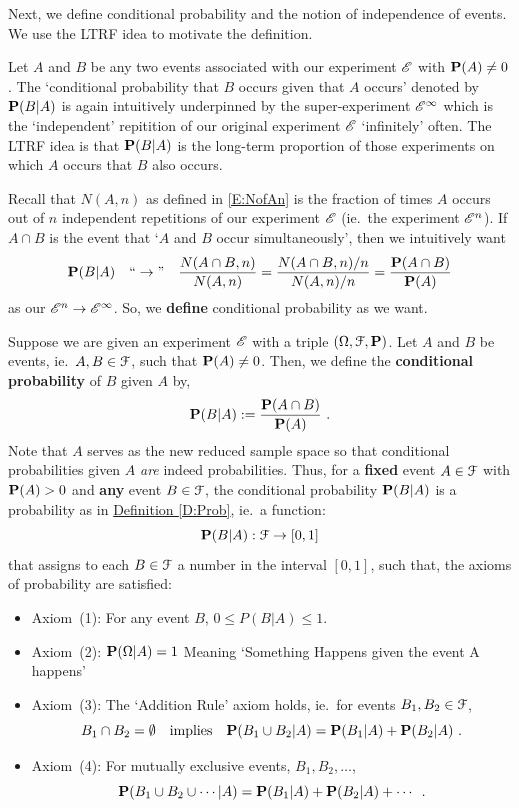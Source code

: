 Next, we define conditional probability and the notion of independence of events.  We use the LTRF idea to motivate the definition.
\begin{idea}
Let $A$ and $B$ be any two events associated with our experiment $\mathscr{E}$ with $\mathbf{P}(A) \neq 0$.  The `conditional probability that $B$ occurs given that $A$ occurs' denoted by $\mathbf{P}(B|A)$ is again intuitively underpinned by the super-experiment $\mathscr{E}^{\infty}$ which is the `independent' repitition of our original experiment $\mathscr{E}$ `infinitely' often.  The LTRF idea is that $\mathbf{P}(B|A)$ is the long-term proportion of those experiments on which $A$ occurs that $B$ also occurs.
 
Recall that $N(A,n)$ as defined in \eqref{E:NofAn} is the fraction of times $A$ occurs out of $n$ independent repetitions of our experiment $\mathscr{E}$ (ie.~the experiment $\mathscr{E}^{n}$).  If $A \cap B$ is the event that `$A$ and $B$ occur simultaneously', then we intuitively want
\[
\p(B|A) \quad \lq\lq \rightarrow " \quad \frac{N(A \cap B,n)}{N(A,n)} = \frac{N(A \cap B,n)/n}{N(A,n)/n} =  \frac{\p(A \cap B)}{\p(A)}
\]
as our $\mathscr{E}^{n} \rightarrow \mathscr{E}^{\infty}$.  So, we {\bf define} conditional probability as we want.
 \end{idea}
 \begin{definition}\label{D:CondProb}
Suppose we are given an experiment $\mathscr{E}$ with a triple $(\Omega, \mathcal{F}, \mathbf{P})$.  Let $A$ and $B$ be events, ie.~$A,B \in \mathcal{F}$, such that $\mathbf{P}(A) \neq 0$.  Then, we define the {\bf conditional probability} of $B$ given $A$ by,
 \begin{equation}\label{E:CPD}
 \mathbf{P}(B|A) := \frac{\mathbf{P}(A \cap B)}{\mathbf{P}(A)} \ .
 \end{equation}
Note that $A$ serves as the new reduced sample space so that conditional probabilities given $A$ \emph{are} indeed  probabilities.
Thus, for a {\bf fixed} event $A \in \mathcal{F}$ with $\mathbf{P}(A)>0$ and {\bf any} event $B \in \mathcal{F}$, the conditional  probability $\mathbf{P}(B | A)$ is a probability as in \hyperref[D:Prob]{Definition \ref*{D:Prob}}, ie.~a function:
 \[
 \mathbf{P}(B | A) : \mathcal{F} \rightarrow [0,1]
 \]
 that assigns to each $B \in \mathcal{F}$ a number in the interval $[0,1]$, such that, the axioms of probability are satisfied:
\begin{itemize}
\item[]{Axiom~(1): For any event $B$, $0\leq P(B|A)\leq 1$.}
\item[]{Axiom~(2): $\mathbf{P}(\Omega | A) = 1$ \qquad Meaning `Something Happens given the event A happens'}
\item[]{Axiom~(3): The `Addition Rule' axiom holds, ie.~for events $B_1, B_2 \in \mathcal{F}$,
 \[
 B_1 \cap B_2 = \emptyset \quad \text{implies} \quad \p(B_1 \cup B_2 | A) = \p(B_1 | A) + \p(B_2 |  A)  \ .
 \]}
\item[]{Axiom~(4): For mutually exclusive events, $B_1,B_2, \ldots$,
\[
\mathbf{P}(B_1 \cup B_2 \cup \cdots | A) = \mathbf{P}(B_1|A)+\mathbf{P}(B_2|A)+\cdots \enspace .
\]}
\end{itemize} 
\end{definition}

